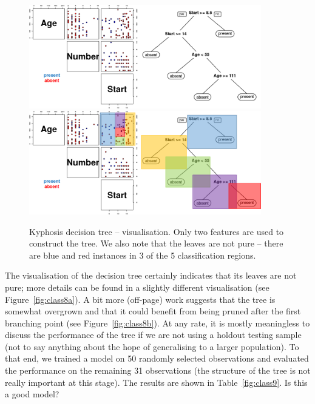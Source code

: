 \begin{figure}[!t]
\centering
\includegraphics[width=0.9\textwidth]{images/DSML/kyphosis1.png}
\includegraphics[width=0.9\textwidth]{images/DSML/kyphosis2.png}
\caption[\small Kyphosis decision tree -- visualisation]{\small Kyphosis decision tree -- visualisation. Only two features are used to construct the tree. We also note that the leaves are not pure -- there are blue and red instances in 3 of the 5 classification regions.}\label{fig:class7}
\end{figure}
\afterpage{\FloatBarrier}
\par The visualisation of the decision tree certainly indicates that its leaves are not pure; more details can be found in a slightly different visualisation (see Figure~\ref{fig:class8a}). A bit more (off-page) work suggests that the tree is somewhat overgrown and that it could benefit from being pruned after the first branching point (see Figure~\ref{fig:class8b}). At any rate, it is mostly meaningless to discuss the performance of the tree if we are not using a holdout testing sample (not to say anything about the hope of generalising to a larger population). To that end, we trained a model on 50 randomly selected observations and evaluated the performance on the remaining 31 observations (the structure of the tree is not really important at this stage). The results are shown in Table~\ref{fig:class9}. Is this a good model? 
